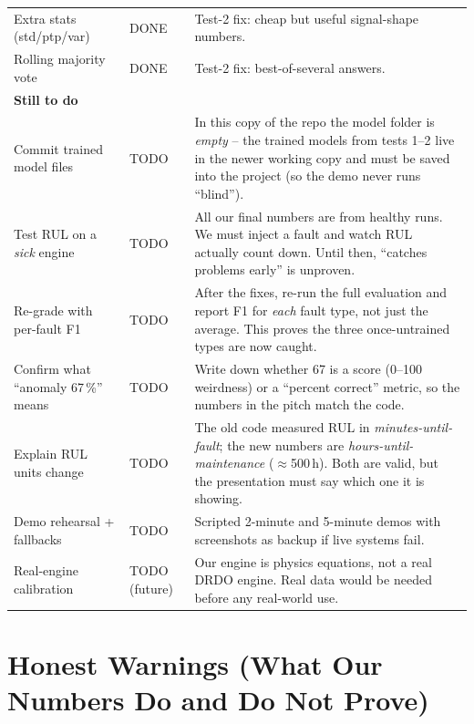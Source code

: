 \documentclass[11pt]{article}
\begin{document}
\begin{longtable}{p{4.6cm} p{2.0cm} p{7.6cm}}
Extra stats (std/ptp/var) & DONE & Test-2 fix: cheap but useful signal-shape numbers. \\
Rolling majority vote & DONE & Test-2 fix: best-of-several answers. \\
\midrule
\textbf{Still to do} & & \\
\midrule
Commit trained model files & TODO & In this copy of the repo the model folder is \emph{empty} -- the trained models from tests 1--2 live in the newer working copy and must be saved into the project (so the demo never runs ``blind''). \\
Test RUL on a \emph{sick} engine & TODO & All our final numbers are from healthy runs. We must inject a fault and watch RUL actually count down. Until then, ``catches problems early'' is unproven. \\
Re-grade with per-fault F1 & TODO & After the fixes, re-run the full evaluation and report F1 for \emph{each} fault type, not just the average. This proves the three once-untrained types are now caught. \\
Confirm what ``anomaly 67\,\%'' means & TODO & Write down whether 67 is a score (0--100 weirdness) or a ``percent correct'' metric, so the numbers in the pitch match the code. \\
Explain RUL units change & TODO & The old code measured RUL in \emph{minutes-until-fault}; the new numbers are \emph{hours-until-maintenance} ($\approx$500\,h). Both are valid, but the presentation must say which one it is showing. \\
Demo rehearsal + fallbacks & TODO & Scripted 2-minute and 5-minute demos with screenshots as backup if live systems fail. \\
Real-engine calibration & TODO (future) & Our engine is physics equations, not a real DRDO engine. Real data would be needed before any real-world use. \\
\bottomrule
\end{longtable}

\section{Honest Warnings (What Our Numbers Do and Do Not Prove)}
\end{document}
